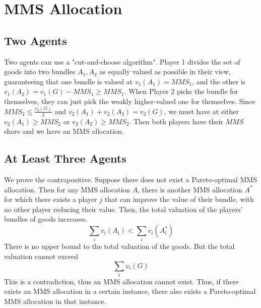 \newpage
\section{MMS Allocation}

\subsection{Two Agents}
Two agents can use a "cut-and-choose algorithm".
Player 1 divides the set of goods into two bundles $A_1,A_2$ 
as equally valued as possible in their view, 
guaranteeing that one bundle is valued
at $v_1(A_1)=MMS_1$, and the other is $v_1(A_2)=v_1(G)-MMS_1\geq MMS_1$.
When Player 2 picks the bundle for themselves, they can just pick
the weakly higher-valued one for themselves. 
Since $MMS_2\leq \frac{v_2(G)}{2}$ and $v_2(A_1)+v_2(A_2)=v_2(G)$,
we must have at either $v_2(A_1) \geq MMS_2$ or $v_2(A_2) \geq MMS_2$.
Then both players have their $MMS$ share and we have an MMS allocation.

\subsection{At Least Three Agents}
We prove the contrapositive.
Suppose there does not exist a Pareto-optimal MMS allocation.
Then for any MMS allocation $A$, there is another MMS allocation $A^*$
for which there exists a player $j$ 
that can improve the value of their bundle,
with no other player reducing their value.
Then, the total valuation of the players' bundles of goods increases.
\[\sum_i v_i(A_i) < \sum_i v_i(A_i^*)\]
There is no upper bound to the total valuation of the goods.
But the total valuation cannot exceed
\[\sum_i v_i(G)\]
This is a contradiction, thus an MMS allocation cannot exist.
Thus, if there exists an MMS allocation in a certain instance,
there also exists a Pareto-optimal MMS allocation in that instance.

